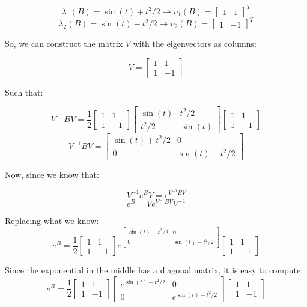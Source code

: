 \documentclass[10pt,a4paper]{article}
\begin{document}
\[ \lambda_{1}(B) = \sin (t) + t^{2}/2  \rightarrow \upsilon_{1}(B) = \begin{bmatrix}1 & 1 \end{bmatrix}^{T} \]
\[ \lambda_{2}(B) = \sin (t) - t^{2}/2  \rightarrow \upsilon_{2}(B) = \begin{bmatrix}1 & -1 \end{bmatrix}^{T} \]

So, we can construct the matrix $V$ with the eigenvectors as columns:

\[ V =
\begin{bmatrix}
1 & 1 \\ 
1 & -1
\end{bmatrix}
\]

Such that:
 
\[ V^{-1}BV =
\dfrac{1}{2} 
\begin{bmatrix}
1 & 1 \\ 
1 & -1
\end{bmatrix}
\begin{bmatrix}
\sin (t) & t^{2}/2 \\
t^{2}/2 & \sin (t)
\end{bmatrix} 
\begin{bmatrix}
1 & 1 \\ 
1 & -1
\end{bmatrix}
\]
\[ V^{-1}BV =
\begin{bmatrix}
\sin (t) + t^{2}/2 & 0 \\
0 & \sin (t) - t^{2}/2
\end{bmatrix}
\]

Now, since we know that:

\[ V^{-1}e^{B}V = e^{V^{-1}BV} \]
\[ e^{B} = Ve^{V^{-1}BV}V^{-1} \]

Replacing what we know:
\[ e^{B} = 
\dfrac{1}{2} 
\begin{bmatrix}
1 & 1 \\ 
1 & -1
\end{bmatrix}
e^{\begin{bmatrix}
\sin (t) + t^{2}/2 & 0 \\
0 & \sin (t) - t^{2}/2
\end{bmatrix}}
\begin{bmatrix}
1 & 1 \\ 
1 & -1
\end{bmatrix}
\]

Since the exponential in the middle has a diagonal matrix, it is easy to compute:
\[ e^{B} = 
\dfrac{1}{2} 
\begin{bmatrix}
1 & 1 \\ 
1 & -1
\end{bmatrix}
\begin{bmatrix}
e^{\sin (t) + t^{2}/2} & 0 \\
0 & e^{\sin (t) - t^{2}/2}
\end{bmatrix}
\begin{bmatrix}
1 & 1 \\ 
1 & -1
\end{bmatrix}
\]
\end{document}
